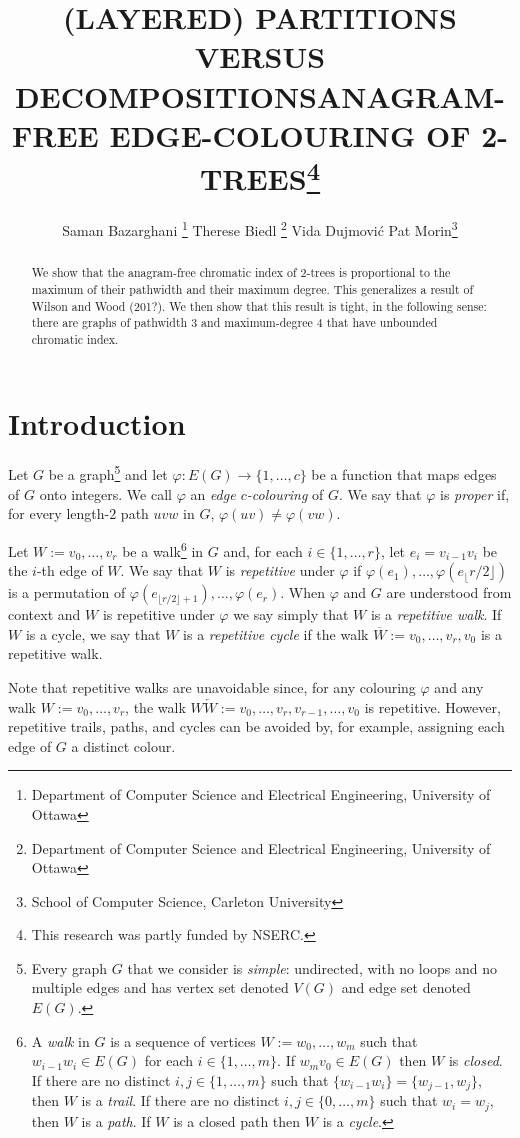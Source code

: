 \documentclass[kpfonts]{patmorin}
\title{\MakeUppercase{(Layered) Partitions versus Decompositions}}
\author{}
\title{\MakeUppercase{Anagram-Free Edge-Colouring of 2-Trees}\thanks{This research was partly funded by NSERC.}}
\author{Saman Bazarghani%
    \thanks{Department of Computer Science and Electrical Engineering, University of Ottawa}\qquad
    Therese Biedl%
    \thanks{Department of Computer Science and Electrical Engineering, University of Ottawa}\qquad
    Vida Dujmović\footnotemark[2]\qquad
    Pat Morin\footnotemark[3]%
    \thanks{School of Computer Science, Carleton University}}
\begin{document}
\maketitle

\begin{abstract}
    We show that the anagram-free chromatic index of $2$-trees is proportional to the maximum of their pathwidth and their maximum degree. This generalizes a result of Wilson and Wood (201?). We then show that this result is tight, in the following sense: there are graphs of pathwidth $3$ and maximum-degree $4$ that have unbounded chromatic index.
\end{abstract}

\section{Introduction}

Let $G$ be a graph\footnote{Every graph $G$ that we consider is \emph{simple}: undirected, with no loops and no multiple edges and has vertex set denoted $V(G)$ and edge set denoted $E(G)$.} and let $\varphi:E(G)\to\{1,\ldots,c\}$ be a function that maps edges of $G$ onto integers.  We call $\varphi$ an \emph{edge $c$-colouring} of $G$.  We say that $\varphi$ is \emph{proper} if, for every length-$2$ path $uvw$ in $G$, $\varphi(uv)\neq\varphi(vw)$.

Let $W:=v_0,\ldots,v_{r}$ be a walk\footnote{A \emph{walk} in $G$ is a sequence of vertices $W:=w_0,\ldots,w_m$ such that $w_{i-1}w_i\in E(G)$ for each $i\in\{1,\ldots,m\}$. If $w_{m}v_0\in E(G)$ then $W$ is \emph{closed}.  If there are no distinct $i,j\in\{1,\ldots,m\}$ such that $\{w_{i-1}w_i\}=\{w_{j-1},w_j\}$, then $W$ is a \emph{trail}.  If there are no distinct $i,j\in\{0,\ldots,m\}$ such that $w_i=w_j$, then $W$ is a \emph{path}.  If $W$ is a closed path then $W$ is a \emph{cycle}.} in $G$ and, for each $i\in\{1,\ldots,r\}$, let $e_i=v_{i-1}v_i$ be the $i$-th edge of $W$. We say that $W$ is \emph{repetitive} under $\varphi$ if $\varphi(e_1),\ldots,\varphi(e_\lfloor r/2\rfloor)$ is a permutation of $\varphi(e_{\lfloor r/2\rfloor+1}),\ldots,\varphi(e_{r})$.  When $\varphi$ and $G$ are understood from context and $W$ is repetitive under $\varphi$ we say simply that $W$ is a \emph{repetitive walk}.  If $W$ is a cycle, we say that $W$ is a \emph{repetitive cycle} if the walk $\overline{W}:=v_0,\ldots,v_r,v_0$ is a repetitive walk.

Note that repetitive walks are unavoidable since, for any colouring $\varphi$ and any walk $W:=v_0,\ldots,v_r$, the walk $W\overleftarrow{W}:=v_0,\ldots,v_r,v_{r-1},\ldots,v_0$ is repetitive.  However, repetitive trails, paths, and cycles can be avoided by, for example, assigning each edge of $G$ a distinct colour.
\end{document}
